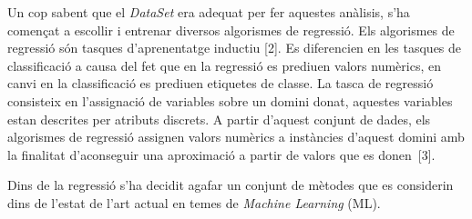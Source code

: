 \documentclass[10pt,a4paper,twocolumn,twoside]{article}
\begin{document}
Un cop sabent que el \textit{DataSet} era adequat per fer aquestes anàlisis, s'ha començat a escollir i entrenar diversos algorismes de regressió. Els algorismes de regressió són tasques d'aprenentatge inductiu [2]. Es diferencien en les tasques de classificació a causa del fet que en la regressió es prediuen valors numèrics, en canvi en la classificació es prediuen etiquetes de classe. La tasca de regressió consisteix en l'assignació de variables sobre un domini donat, aquestes variables estan descrites per atributs discrets. A partir d'aquest conjunt de dades, els algorismes de regressió assignen valors numèrics a instàncies d'aquest domini amb la finalitat d'aconseguir una aproximació a partir de valors que es donen~[3].

Dins de la regressió s'ha decidit agafar un conjunt de mètodes que es considerin dins de l'estat de l'art actual en temes de \textit{Machine Learning} (ML).
\end{document}
